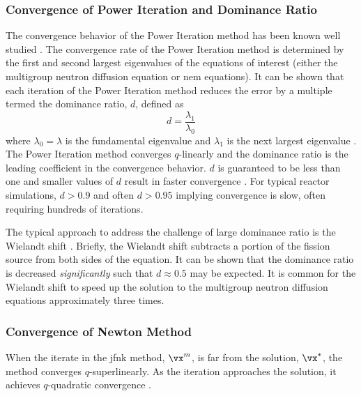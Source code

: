     \subsubsection{Convergence of Power Iteration and Dominance Ratio}
      The convergence behavior of the Power Iteration method has been known well
      studied \cite{nakamura,gehinThesis,my_ms_thesis}. The convergence rate of
      the Power Iteration method is determined by the first and second largest
      eigenvalues of the equations of interest (either the multigroup neutron
      diffusion equation or \gls{nem} equations). It can be shown that each
      iteration of the Power Iteration method reduces the error by a multiple
      termed the dominance ratio, $d$, defined as
      \begin{equation}
        \label{eq:dominance_ratio}
        d = \frac{\lambda_1}{\lambda_0}
      \end{equation}
      where $\lambda_0 = \lambda$ is the fundamental eigenvalue and $\lambda_1$
      is the next largest eigenvalue \cite{my_ms_thesis}. The Power Iteration
      method converges $q$-linearly and the dominance ratio is the leading
      coefficient in the convergence behavior. $d$ is guaranteed to be less than
      one and smaller values of $d$ result in faster convergence 
      \cite{nakamura}. For typical reactor simulations, $d > 0.9$ and often $d >
      0.95$ implying convergence is slow, often requiring hundreds of
      iterations.

      The typical approach to address the challenge of large dominance ratio is
      the Wielandt shift \cite{gehinThesis}. Briefly, the Wielandt shift
      subtracts a portion of the fission source from both sides of the equation.
      It can be shown that the dominance ratio is decreased
      \textit{significantly} such that $d \approx 0.5$ may be expected. It is
      common for the Wielandt shift to speed up the solution to the multigroup
      neutron diffusion equations approximately three times.

    \subsubsection{Convergence of Newton Method}
      When the iterate in the \gls{jfnk} method, $\vx^m$, is far from the
      solution, $\vx^*$, the method converges $q$-superlinearly. As the
      iteration approaches the solution, it achieves $q$-quadratic convergence
      \cite{textbookkelley}.

